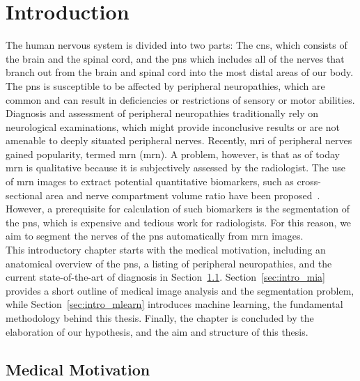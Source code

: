 \chapter{Introduction} %
The human nervous system is divided into two parts: The \gls{cns}, which consists of the brain and the spinal cord, and the \gls{pns} which includes all of the nerves that branch out from the brain and spinal cord into the most distal areas of our body. The \gls{pns} is susceptible to be affected by peripheral neuropathies, which are common and can result in deficiencies or restrictions of sensory or motor abilities. Diagnosis and assessment of peripheral neuropathies traditionally rely on neurological examinations, which might provide inconclusive results or are not amenable to deeply situated peripheral nerves. Recently, \gls{mri} of peripheral nerves gained popularity, termed \acrlong{mrn} (\acrshort{mrn}). A problem, however, is that as of today \acrshort{mrn} is qualitative because it is subjectively assessed by the radiologist. The use of \acrshort{mrn} images to extract potential quantitative biomarkers, such as cross-sectional area and nerve compartment volume ratio have been proposed~\cite{Kronlage2017,Felisaz2017MRNeuropathy.}. However, a prerequisite for calculation of such biomarkers is the segmentation of the \gls{pns}, which is expensive and tedious work for radiologists. For this reason, we aim to segment the nerves of the \gls{pns} automatically from \acrshort{mrn} images.\\
This introductory chapter starts with the medical motivation, including an anatomical overview of the \gls{pns}, a listing of peripheral neuropathies, and the current state-of-the-art of diagnosis in Section~\ref{sec:intro_medical}. Section~\ref{sec:intro_mia} provides a short outline of medical image analysis and the segmentation problem, while  Section~\ref{sec:intro_mlearn} introduces machine learning, the fundamental methodology behind this thesis. Finally, the chapter is concluded by the elaboration of our hypothesis, and the aim and structure of this thesis.

\section{Medical Motivation} \label{sec:intro_medical} %
